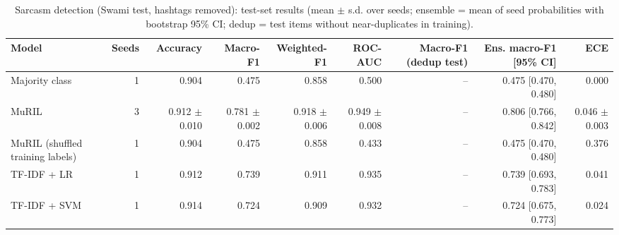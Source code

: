 \begin{table}[t]
\centering
\small
\caption{Sarcasm detection (Swami test, hashtags removed): test-set results (mean $\pm$ s.d. over seeds; ensemble = mean of seed probabilities with bootstrap 95\% CI; dedup = test items without near-duplicates in training).}
\label{tab:tab14_results_sarcasm}
\begin{tabular}{lrrrrrrrr}
\toprule
Model & Seeds & Accuracy & Macro-F1 & Weighted-F1 & ROC-AUC & Macro-F1 (dedup test) & Ens. macro-F1 [95\% CI] & ECE \\
\midrule
Majority class & 1 & 0.904 & 0.475 & 0.858 & 0.500 & -- & 0.475 [0.470, 0.480] & 0.000 \\
MuRIL & 3 & 0.912 $\pm$ 0.010 & 0.781 $\pm$ 0.002 & 0.918 $\pm$ 0.006 & 0.949 $\pm$ 0.008 & -- & 0.806 [0.766, 0.842] & 0.046 $\pm$ 0.003 \\
MuRIL (shuffled training labels) & 1 & 0.904 & 0.475 & 0.858 & 0.433 & -- & 0.475 [0.470, 0.480] & 0.376 \\
TF-IDF + LR & 1 & 0.912 & 0.739 & 0.911 & 0.935 & -- & 0.739 [0.693, 0.783] & 0.041 \\
TF-IDF + SVM & 1 & 0.914 & 0.724 & 0.909 & 0.932 & -- & 0.724 [0.675, 0.773] & 0.024 \\
\bottomrule
\end{tabular}
\end{table}
